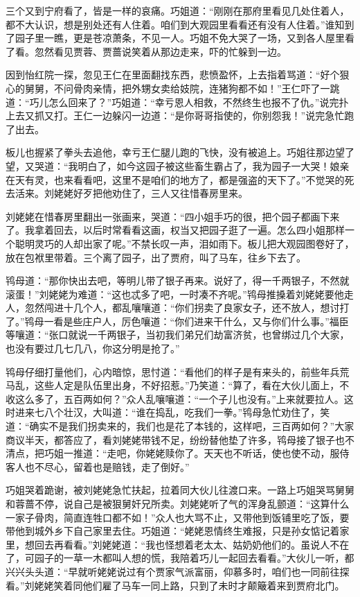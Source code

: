 \documentclass[12pt,oneside]{book}
\begin{document}
三个又到宁府看了，皆是一样的哀痛。巧姐道：“刚刚在那府里看见几处住着人，都不大认识，想是别处还有人住着。咱们到大观园里看看还有没有人住着。”谁知到了园子里一瞧，更是苍凉萧条，不见一人。巧姐不免大哭了一场，又到各人屋里看了看。忽然看见贾蓉、贾蔷说笑着从那边走来，吓的忙躲到一边。

因到怡红院一探，忽见王仁在里面翻找东西，悲愤盈怀，上去指着骂道：“好个狠心的舅舅，不问骨肉亲情，把外甥女卖给妓院，连猪狗都不如！”王仁吓了一跳道：“巧儿怎么回来了？”巧姐道：“幸亏恩人相救，不然终生也报不了仇。”说完扑上去又抓又打。王仁一边躲闪一边道：“是你哥哥指使的，你别怨我！”说完急忙跑了出去。

板儿也握紧了拳头去追他，幸亏王仁腿儿跑的飞快，没有被追上。巧姐往那边望了望，又哭道：“我明白了，如今这园子被这些畜生霸占了，我为园子一大哭！娘亲在天有灵，也来看看吧，这里不是咱们的地方了，都是强盗的天下了。”不觉哭的死去活来。刘姥姥好歹把他劝住了，三人又往惜春房里来。

刘姥姥在惜春房里翻出一张画来，哭道：“四小姐手巧的很，把个园子都画下来了。我拿着回去，以后时常看看这画，权当又把园子逛了一遍。怎么四小姐那样一个聪明灵巧的人却出家了呢。”不禁长叹一声，泪如雨下。板儿把大观园图卷好了，放在包袱里带着。三个离了园子，出了贾府，叫了马车，往乡下去了。

鸨母道：“那你快出去吧，等明儿带了银子再来。说好了，得一千两银子，不然就滚蛋！”刘姥姥为难道：“这也忒多了吧，一时凑不齐呢。”鸨母推搡着刘姥姥要他走人，忽然闯进十几个人，都乱嚷嚷道：“你们拐卖了良家女子，还不放人，想讨打了。”鸨母一看是些庄户人，厉色嚷道：“你们进来干什么，又与你们什么事。”福臣等嚷道：“张口就说一千两银子，当初我们弟兄们劫富济贫，也曾绑过几个大家，也没有要过几七几八，你这分明是抢了。”

鸨母仔细打量他们，心内暗惊，思忖道：“看他们的样子是有来头的，前些年兵荒马乱，这些人定是队伍里出身，不好招惹。”乃笑道：“算了，看在大伙儿面上，不收这么多了，五百两如何？”众人乱嚷嚷道：“一个子儿也没有。”上来就要拉人。这时进来七八个壮汉，大叫道：“谁在捣乱，吃我们一拳。”鸨母急忙劝住了，笑道：“确实不是我们拐卖来的，我们也是花了本钱的，这样吧，三百两如何？”大家商议半天，都答应了，看刘姥姥带钱不足，纷纷替他垫了许多，鸨母接了银子也不清点，把巧姐一推道：“走吧，你姥姥赎你了。天天也不听话，使也使不动，服侍客人也不尽心，留着也是赔钱，走了倒好。”

巧姐哭着跪谢，被刘姥姥急忙扶起，拉着同大伙儿往渡口来。一路上巧姐哭骂舅舅和蓉蔷不停，说自己是被狠舅奸兄所卖。刘姥姥听了气的浑身乱颤道：“这算什么一家子骨肉，简直连牲口都不如！”众人也大骂不止，又带他到饭铺里吃了饭，要带他到城外乡下自己家里去住。巧姐道：“姥姥恩情终生难报，只是孙女惦记着家里，想回去再看看。”刘姥姥道：“我也怪想着老太太、姑奶奶他们的。虽说人不在了，可园子的一草一木都叫人想的慌，我陪着巧儿一起回去看看。”大伙儿一听，都兴兴头头道：“早就听姥姥说过有个贾家气派富丽，仰慕多时，咱们也一同前往探看。”刘姥姥笑着同他们雇了马车一同上路，只到了未时才颠簸着来到贾府北门。
\end{document}

